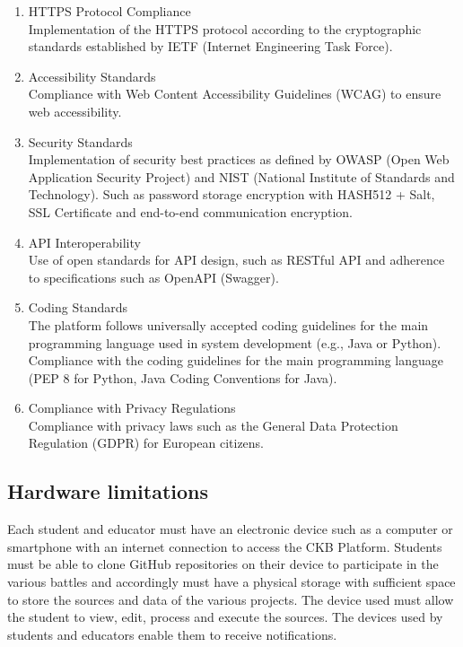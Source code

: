 \begin{enumerate}
      \item HTTPS Protocol Compliance\\
            Implementation of the HTTPS protocol according to the cryptographic standards established by IETF (Internet Engineering Task Force).

      \item Accessibility Standards\\
            Compliance with Web Content Accessibility Guidelines (WCAG) to ensure web accessibility.

      \item Security Standards\\
            Implementation of security best practices as defined by OWASP (Open Web Application Security Project) and NIST (National Institute of Standards and Technology).
            Such as password storage encryption with HASH512 + Salt, SSL Certificate and end-to-end communication encryption.


      \item API Interoperability\\
            Use of open standards for API design, such as RESTful API and adherence to specifications such as OpenAPI (Swagger).


      \item Coding Standards\\
            The platform follows universally accepted coding guidelines for the main programming language used in system development (e.g., Java or Python).
            Compliance with the coding guidelines for the main programming language (PEP 8 for Python, Java Coding Conventions for Java).


      \item Compliance with Privacy Regulations\\
            Compliance with privacy laws such as the General Data Protection Regulation (GDPR) for European citizens.
\end{enumerate}

\subsection{Hardware limitations}
Each student and educator must have an electronic device such as a computer or smartphone with an internet connection to
access the CKB Platform.
Students must be able to clone GitHub repositories on their device to participate in the various battles and accordingly must have a physical storage with sufficient space to store the sources and data of the various projects.
The device used must allow the student to view, edit, process and execute the sources.
The devices used by students and educators enable them to receive notifications.

